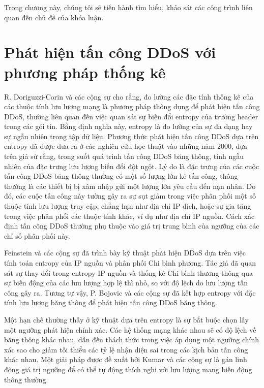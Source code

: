 Trong chương này, chúng tôi sẽ tiến hành tìm hiểu, khảo sát các công trình liên quan đến chủ đề của khóa luận.


\section{Phát hiện tấn công DDoS với phương pháp thống kê}
\label{stat-method}

R. Doriguzzi-Corin và các cộng sự \cite{27-Corin} cho rằng, đo lường các đặc tính thống kê của các thuộc tính lưu lượng mạng là phương pháp thông dụng để phát hiện tấn công DDoS, thường liên quan đến việc quan sát sự biến đổi entropy của trường header trong các gói tin. Bằng định nghĩa này, entropy là đo lường của sự đa dạng hay sự ngẫu nhiên trong tập dữ liệu. Phương thức phát hiện tấn công DDoS dựa trên entropy đã được đưa ra ở các nghiên cứu học thuật vào những năm 2000, dựa trên giả sử rằng, trong suốt quá trình tấn công DDoS băng thông, tính ngẫu nhiên của đặc trưng lưu lượng biến đổi đột ngột. Lý do là đặc trưng của các cuộc tấn công DDoS băng thông thường có một số lượng lớn kẻ tấn công, thông thường là các thiết bị bị xâm nhập gửi một lượng lớn yêu cầu đến nạn nhân. Do đó, các cuộc tấn công này tường gây ra sự sụt giảm trong việc phân phối một số thuộc tính lưu lượng truy cập, chẳng hạn như địa chỉ IP đích, hoặc sự gia tăng trong việc phân phối các thuộc tính khác, ví dụ như địa chỉ IP nguồn. Cách xác định tấn công DDoS thường phụ thuộc vào giá trị trung bình của ngưỡng của các chỉ số phân phối này.

Feinstein và các cộng sự \cite{29-Feinstein} đã trình bày kỹ thuật phát hiện DDoS dựa trên việc tính toán entropy của IP nguồn và phân phối Chi bình phương. Tác giả đã quan sát sự thay đổi trong entropy IP nguồn và thống kê Chi bình thương thông qua sự biến động của các lưu lượng hợp lệ thì nhỏ, so với độ lệch do lưu lượng tấn công gây ra. Tương tự vậy, P. Bojovic và các cộng sự \cite{30-Bojovic} đã kết hợp entropy với đặc tính lưu lượng băng thông để phát hiện tấn công DDoS băng thông.

Một hạn chế thường thấy ở kỹ thuật dựa trên entropy là sự bắt buộc chọn lấy một ngưỡng phát hiện chính xác. Các hệ thống mạng khác nhau sẽ có độ lệch về băng thông khác nhau, dẫn đến thách thức trong việc áp dụng một ngưỡng chính xác sao cho giảm tối thiểu các tỷ lệ nhận diện sai trong các kịch bản tấn công khác nhau. Một giải pháp được đề xuất bởi Kumar và các cộng sự \cite{32-Kumar} là gán linh động giá trị ngưỡng để có thể tự động thích nghi với lưu lượng mạng biến động thông thường. 


